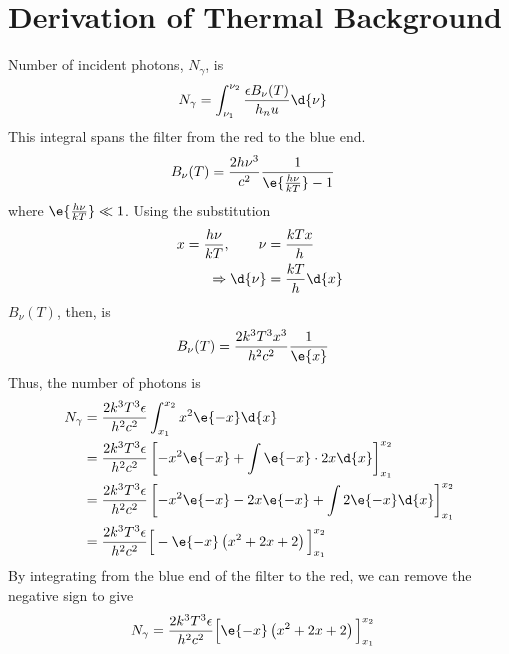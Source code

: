 
\section{Derivation of Thermal Background} %
\label{sec:derivation_of_thermal_background}
	Number of incident photons, $N_{\gamma}$, is
	\begin{align}
		N_{\gamma} &= \int_{\nu_1}^{\nu_2} \frac{\epsilon B_\nu(T)}{h_nu}\d{\nu}
	\end{align}
	This integral spans the filter from the red to the blue end.
	\begin{align}
		B_\nu(T) &= \frac{2h\nu^3}{c^2}\frac{1}{\e{\frac{h\nu}{kT}}-1}
	\end{align}
	where $\e{\frac{h\nu}{kT}} \ll 1$. Using the substitution
	\begin{align}
		x = \frac{h\nu}{kT}, \qquad \nu &= \frac{kTx}{h} \\
		\Rightarrow \d{\nu} &= \frac{kT}{h}\d{x}
	\end{align}
	$B_\nu(T)$, then, is
	\begin{align}
		B_\nu(T) &= \frac{2k^3 T^3 x^3}{h^2 c^2} \frac{1}{\e{x}}
	\end{align}
	Thus, the number of photons is
	\begin{align}
		N_\gamma &= \frac{2 k^3 T^3\epsilon}{h^2 c^2} \int_{x_1}^{x_2}x^2 \e{-x}\d{x} \\
			&= \frac{2 k^3 T^3\epsilon}{h^2 c^2} \left[ -x^2 \e{-x} + \int \e{-x}\cdot 2x\d{x} \right]_{x_1}^{x_2} \\
			&= \frac{2 k^3 T^3\epsilon}{h^2 c^2} \left[ -x^2 \e{-x} -2x\e{-x} + \int 2\e{-x}\d{x} \right]_{x_1}^{x_2} \\
			&= \frac{2 k^3 T^3\epsilon}{h^2 c^2} \Big[ -\e{-x}\left( x^2 + 2x + 2 \right) \Big]_{x_1}^{x_2}
	\end{align}
	By integrating from the blue end of the filter to the red, we can remove the negative sign to give
	\begin{align}
		N_\gamma &= \frac{2 k^3 T^3\epsilon}{h^2 c^2} \Big[\e{-x}\left( x^2 + 2x + 2 \right) \Big]_{x_1}^{x_2}
	\end{align}
